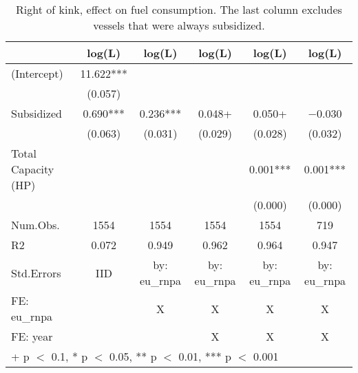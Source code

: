 \begin{table}

\caption{\label{tab:}Right of kink, effect on fuel consumption. The last column excludes vessels that were always subsidized.}
\centering
\begin{tabular}[t]{lccccc}
\toprule
  & log(L) & log(L)  & log(L)   & log(L)    & log(L)    \\
\midrule
(Intercept) & \num{11.622}*** &  &  &  & \\
 & (\num{0.057}) &  &  &  & \\
Subsidized & \num{0.690}*** & \num{0.236}*** & \num{0.048}+ & \num{0.050}+ & \num{-0.030}\\
 & (\num{0.063}) & (\num{0.031}) & (\num{0.029}) & (\num{0.028}) & (\num{0.032})\\
Total Capacity (HP) &  &  &  & \num{0.001}*** & \num{0.001}***\\
 &  &  &  & (\num{0.000}) & (\num{0.000})\\
\midrule
Num.Obs. & \num{1554} & \num{1554} & \num{1554} & \num{1554} & \num{719}\\
R2 & \num{0.072} & \num{0.949} & \num{0.962} & \num{0.964} & \num{0.947}\\
Std.Errors & IID & by: eu\_rnpa & by: eu\_rnpa & by: eu\_rnpa & by: eu\_rnpa\\
FE: eu_rnpa &  & X & X & X & X\\
FE: year &  &  & X & X & X\\
\bottomrule
\multicolumn{6}{l}{\rule{0pt}{1em}+ p $<$ 0.1, * p $<$ 0.05, ** p $<$ 0.01, *** p $<$ 0.001}\\
\end{tabular}
\end{table}
